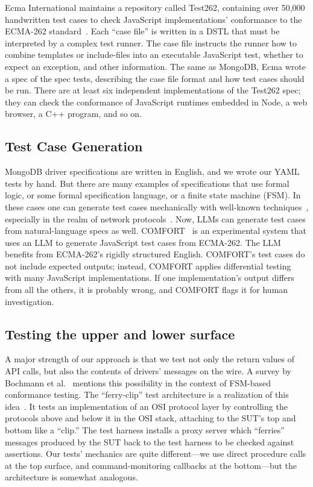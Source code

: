 \documentclass[conference]{IEEEtran}
\begin{document}
Ecma International maintains a repository called Test262, containing over 50,000 handwritten test cases to check JavaScript implementations' conformance to the ECMA-262 standard~\cite{ye_automated_2021}. Each ``case file'' is written in a DSTL that must be interpreted by a complex test runner. The case file instructs the runner how to combine templates or include-files into an executable JavaScript test, whether to expect an exception, and other information. The same as MongoDB, Ecma wrote a spec of the spec tests, describing the case file format and how test cases should be run. There are at least six independent implementations of the Test262 spec; they can check the conformance of JavaScript runtimes embedded in Node, a web browser, a C++ program, and so on.

\subsection{Test Case Generation}
\label{test-case-generation}

MongoDB driver specifications are written in English, and we wrote our YAML tests by hand. But there are many examples of specifications that use formal logic, or some formal specification language, or a finite state machine (FSM). In these cases one can generate test cases mechanically with well-known techniques~\cite{richardson_approaches_1989}, especially in the realm of network protocols~\cite{hoque_ensuring_2015,mcmillan_formal_2019,mcmillan_compositional_2019,bishop_engineering_2006,singha_messi_2024,raghavan_protocol_1995,dssouli_test_1999}. Now, LLMs can generate test cases from natural-language specs as well. COMFORT~\cite{ye_automated_2021} is an experimental system that uses an LLM to generate JavaScript test cases from ECMA-262. The LLM benefits from ECMA-262's rigidly structured English. COMFORT's test cases do not include expected outputs; instead, COMFORT applies differential testing with many JavaScript implementations. If one implementation's output differs from all the others, it is probably wrong, and COMFORT flags it for human investigation.

\subsection{Testing the upper and lower surface}

A major strength of our approach is that we test not only the return values of API calls, but also the contents of drivers' messages on the wire. A survey by Bochmann et al.~\cite{bochmann_protocol_1994} mentions this possibility in the context of FSM-based conformance testing. The ``ferry-clip'' test architecture is a realization of this idea~\cite{chanson_design_1989}. It tests an implementation of an OSI protocol layer by controlling the protocols above and below it in the OSI stack, attaching to the SUT's top and bottom like a ``clip.'' The test harness installs a proxy server which ``ferries'' messages produced by the SUT back to the test harness to be checked against assertions. Our tests' mechanics are quite different---we use direct procedure calls at the top surface, and command-monitoring callbacks at the bottom---but the architecture is somewhat analogous.
\end{document}

